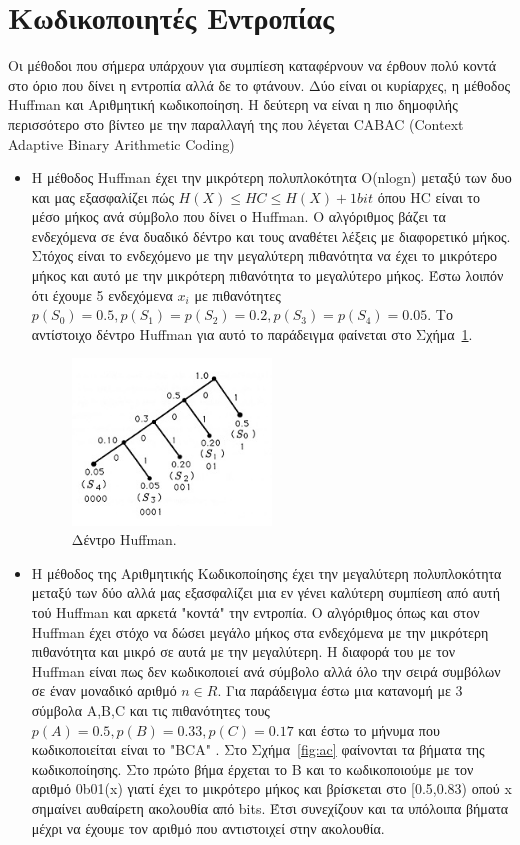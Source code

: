 \section{Κωδικοποιητές Εντροπίας}
\label{section:sect33}

\indent Οι μέθοδοι που σήμερα υπάρχουν για συμπίεση καταφέρνουν να έρθουν πολύ κοντά στο όριο που δίνει η εντροπία αλλά δε το φτάνουν. Δύο είναι οι κυρίαρχες, η μέθοδος Huffman και Αριθμητική κωδικοποίηση. Η δεύτερη να είναι η πιο δημοφιλής περισσότερο στο βίντεο με την παραλλαγή της που λέγεται CABAC (Context Adaptive Binary Arithmetic Coding)
\begin{itemize}
  \item Η μέθοδος Huffman έχει την μικρότερη πολυπλοκότητα O(nlogn) μεταξύ των δυο και μας εξασφαλίζει πώς $ H(X) \leq HC \leq H(X)+1bit  $ όπου HC είναι το μέσο μήκος ανά σύμβολο που δίνει ο Huffman. Ο αλγόριθμος βάζει τα ενδεχόμενα σε ένα δυαδικό δέντρο και τους αναθέτει λέξεις με διαφορετικό μήκος. Στόχος είναι το ενδεχόμενο με την μεγαλύτερη πιθανότητα να έχει το μικρότερο μήκος και αυτό με την μικρότερη πιθανότητα το μεγαλύτερο μήκος. Έστω λοιπόν ότι έχουμε 5 ενδεχόμενα $x_i$ με πιθανότητες $p(S_0) = 0.5, p(S_1)=p(S_2)=0.2, p(S_3)=p(S_4)=0.05$. Το αντίστοιχο δέντρο Huffman για αυτό το παράδειγμα φαίνεται στο Σχήμα~\ref{fig:huffman}.
      \begin{figure}[h!]
          \centering
          \includegraphics[width=0.5\textwidth]{chapter3/huffman.jpg}
          \caption{Δέντρο Huffman.}
          \label{fig:huffman}
      \end{figure}

\newpage
  \item Η μέθοδος της Αριθμητικής Κωδικοποίησης έχει την μεγαλύτερη πολυπλοκότητα μεταξύ των δύο αλλά μας εξασφαλίζει μια εν γένει καλύτερη συμπίεση από αυτή τού Huffman και αρκετά "κοντά" την εντροπία. Ο αλγόριθμος όπως και στον Huffman έχει στόχο να δώσει μεγάλο μήκος στα ενδεχόμενα με την μικρότερη πιθανότητα και μικρό σε αυτά με την μεγαλύτερη. Η διαφορά του με τον Ηuffman είναι πως δεν κωδικοποιεί ανά σύμβολο αλλά όλο την σειρά συμβόλων σε έναν μοναδικό αριθμό $n \in R$. Για παράδειγμα έστω μια κατανομή με 3 σύμβολα A,B,C και τις πιθανότητες τους $ p(A) = 0.5, p(B) = 0.33, p(C) = 0.17 $ και έστω το μήνυμα που κωδικοποιείται είναι το "BCA" . Στο Σχήμα~\ref{fig:ac} φαίνονται τα βήματα της κωδικοποίησης. Στο πρώτο βήμα έρχεται το B και το κωδικοποιούμε με τον αριθμό 0b01(x) γιατί έχει το μικρότερο μήκος και βρίσκεται στο [0.5,0.83) οπού x σημαίνει αυθαίρετη ακολουθία από bits. Έτσι συνεχίζουν και τα υπόλοιπα βήματα μέχρι να έχουμε τον αριθμό που αντιστοιχεί στην ακολουθία.


\end{itemize}

